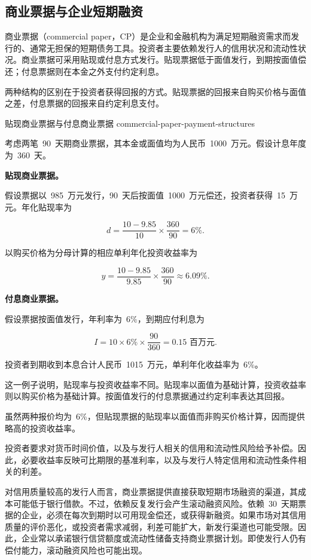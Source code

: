 \subsection{商业票据与企业短期融资}

商业票据（commercial paper，CP）是企业和金融机构为满足短期融资需求而发行的、通常无担保的短期债务工具。投资者主要依赖发行人的信用状况和流动性状况。商业票据可采用贴现或付息方式发行。贴现票据低于面值发行，到期按面值偿还；付息票据则在本金之外支付约定利息。

两种结构的区别在于投资者获得回报的方式。贴现票据的回报来自购买价格与面值之差，付息票据的回报来自约定利息支付。

\begin{example}{贴现商业票据与付息商业票据}
{commercial-paper-payment-structures}

考虑两笔~90~天期商业票据，其本金或面值均为人民币~1000~万元。假设计息年度为~360~天。

\textbf{贴现商业票据。}

假设票据以~985~万元发行，90~天后按面值~1000~万元偿还，投资者获得~15~万元。年化贴现率为

\[
d=\frac{10-9.85}{10}\times\frac{360}{90}
=6\%.
\]

以购买价格为分母计算的相应单利年化投资收益率为

\[
y=\frac{10-9.85}{9.85}\times\frac{360}{90}
\approx 6.09\%.
\]

\textbf{付息商业票据。}

假设票据按面值发行，年利率为~6\%，到期应付利息为

\[
I=10\times 6\%\times\frac{90}{360}
=0.15\text{ 百万元}.
\]

投资者到期收到本息合计人民币~1015~万元，单利年化收益率为~6\%。

这一例子说明，贴现率与投资收益率不同。贴现率以面值为基础计算，投资收益率则以购买价格为基础计算。按面值发行的付息票据通过约定利率表达其回报。

虽然两种报价均为~6\%，但贴现票据的贴现率以面值而非购买价格计算，因而提供略高的投资收益率。

\end{example}

投资者要求对货币时间价值，以及与发行人相关的信用和流动性风险给予补偿。因此，必要收益率反映可比期限的基准利率，以及与发行人特定信用和流动性条件相关的利差。

对信用质量较高的发行人而言，商业票据提供直接获取短期市场融资的渠道，其成本可能低于银行借款。不过，依赖反复发行会产生滚动融资风险。依赖~30~天期票据的企业，必须在每次到期时以可用现金偿还，或获得新融资。如果市场对其信用质量的评价恶化，或投资者需求减弱，利差可能扩大，新发行渠道也可能受限。因此，企业常以承诺银行信贷额度或流动性储备支持商业票据计划。即使发行人仍有偿付能力，滚动融资风险也可能出现。

